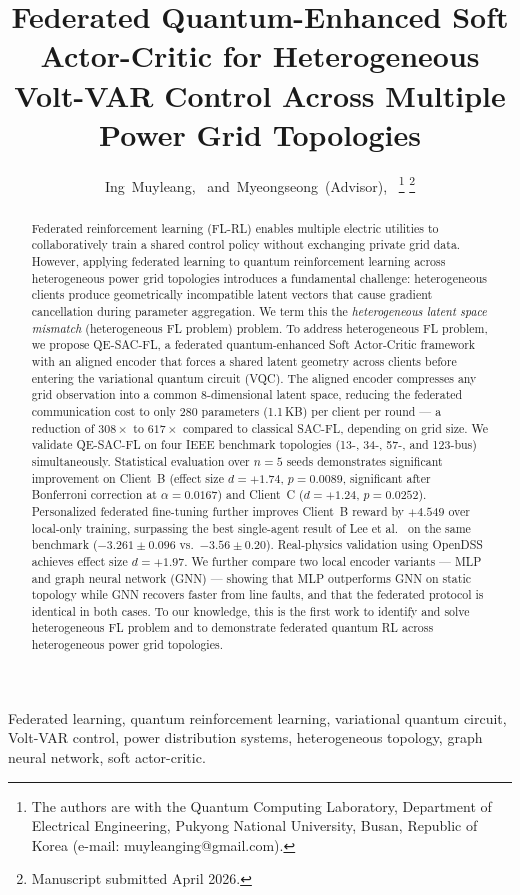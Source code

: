 \documentclass[journal]{IEEEtran}
\title{Federated Quantum-Enhanced Soft Actor-Critic for Heterogeneous
Volt-VAR Control Across Multiple Power Grid Topologies}
\author{Ing~Muyleang,~\IEEEmembership{Student Member,~IEEE,}
        and~Myeongseong~(Advisor),~\IEEEmembership{Member,~IEEE}%
\thanks{The authors are with the Quantum Computing Laboratory,
Department of Electrical Engineering, Pukyong National University,
Busan, Republic of Korea (e-mail: muyleanging@gmail.com).}%
\thanks{Manuscript submitted April 2026.}}
\begin{document}
\maketitle

\begin{abstract}
Federated reinforcement learning (FL-RL) enables multiple electric utilities
to collaboratively train a shared control policy without exchanging private
grid data. However, applying federated learning to quantum reinforcement
learning across heterogeneous power grid topologies introduces a fundamental
challenge: heterogeneous clients produce geometrically incompatible latent
vectors that cause gradient cancellation during parameter aggregation.
We term this the \textit{heterogeneous latent space mismatch} (heterogeneous FL problem) problem.
To address heterogeneous FL problem, we propose QE-SAC-FL, a federated quantum-enhanced
Soft Actor-Critic framework with an aligned encoder that forces a shared
latent geometry across clients before entering the variational quantum circuit
(VQC). The aligned encoder compresses any grid observation into a common
8-dimensional latent space, reducing the federated communication cost to only
280 parameters (1.1\,KB) per client per round --- a reduction of $308\times$
to $617\times$ compared to classical SAC-FL, depending on grid size.
We validate QE-SAC-FL on four IEEE benchmark topologies (13-, 34-, 57-, and
123-bus) simultaneously. Statistical evaluation over $n=5$ seeds demonstrates
significant improvement on Client~B (effect size $d=+1.74$, $p=0.0089$,
significant after Bonferroni correction at $\alpha=0.0167$) and Client~C
($d=+1.24$, $p=0.0252$). Personalized federated fine-tuning further improves
Client~B reward by $+4.549$ over local-only training, surpassing the
best single-agent result of Lee et al.\ \cite{lee2022graph} on the same
benchmark ($-3.261 \pm 0.096$ vs.\ $-3.56 \pm 0.20$).
Real-physics validation using OpenDSS achieves effect size $d=+1.97$.
We further compare two local encoder variants --- MLP and graph neural
network (GNN) --- showing that MLP outperforms GNN on static topology
while GNN recovers faster from line faults, and that the federated protocol
is identical in both cases. To our knowledge, this is the first work to
identify and solve heterogeneous FL problem and to demonstrate federated quantum RL across
heterogeneous power grid topologies.
\end{abstract}

\begin{IEEEkeywords}
Federated learning, quantum reinforcement learning, variational quantum circuit,
Volt-VAR control, power distribution systems, heterogeneous topology,
graph neural network, soft actor-critic.
\end{IEEEkeywords}
\end{document}
